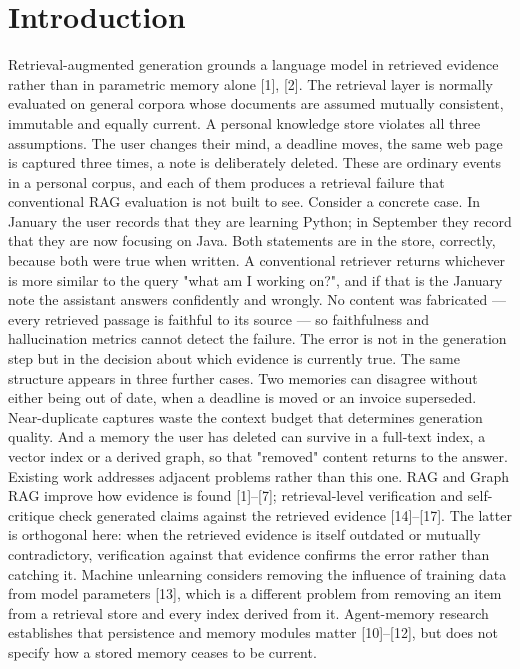\documentclass[conference]{IEEEtran}
\begin{document}
\section{Introduction}
Retrieval-augmented generation grounds a language model in retrieved evidence rather than in parametric memory alone [1], [2]. The retrieval layer is normally evaluated on general corpora whose documents are assumed mutually consistent, immutable and equally current. A personal knowledge store violates all three assumptions. The user changes their mind, a deadline moves, the same web page is captured three times, a note is deliberately deleted. These are ordinary events in a personal corpus, and each of them produces a retrieval failure that conventional RAG evaluation is not built to see.
Consider a concrete case. In January the user records that they are learning Python; in September they record that they are now focusing on Java. Both statements are in the store, correctly, because both were true when written. A conventional retriever returns whichever is more similar to the query "what am I working on?", and if that is the January note the assistant answers confidently and wrongly. No content was fabricated --- every retrieved passage is faithful to its source --- so faithfulness and hallucination metrics cannot detect the failure. The error is not in the generation step but in the decision about which evidence is currently true.
The same structure appears in three further cases. Two memories can disagree without either being out of date, when a deadline is moved or an invoice superseded. Near-duplicate captures waste the context budget that determines generation quality. And a memory the user has deleted can survive in a full-text index, a vector index or a derived graph, so that "removed" content returns to the answer.
Existing work addresses adjacent problems rather than this one. RAG and Graph RAG improve how evidence is found [1]--[7]; retrieval-level verification and self-critique check generated claims against the retrieved evidence [14]--[17]. The latter is orthogonal here: when the retrieved evidence is itself outdated or mutually contradictory, verification against that evidence confirms the error rather than catching it. Machine unlearning considers removing the influence of training data from model parameters [13], which is a different problem from removing an item from a retrieval store and every index derived from it. Agent-memory research establishes that persistence and memory modules matter [10]--[12], but does not specify how a stored memory ceases to be current.
\end{document}
